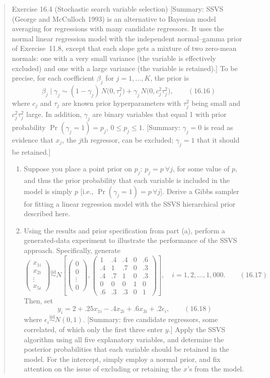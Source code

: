 \documentclass[11pt,a4paper]{article}
\begin{document}
\begin{quote}\small
Exercise 16.4 (Stochastic search variable selection) [Summary: SSVS (George and McCulloch 1993) is an alternative to Bayesian
model averaging for regressions with many candidate regressors. It uses the normal linear regression model with the
independent normal--gamma prior of Exercise~11.8, except that each slope gets a mixture of two zero-mean normals: one with a very
small variance (the variable is effectively excluded) and one with a large variance (the variable is retained).]
To be precise, for each coefficient $\beta_j$ for $j=1,\dots,K$, the prior is
\[
\beta_j\mid\gamma_j\sim(1-\gamma_j)\,N\big(0,\tau_j^2\big)+\gamma_j\,N\big(0,c_j^2\tau_j^2\big),\qquad(16.16)
\]
where $c_j$ and $\tau_j$ are known prior hyperparameters with $\tau_j^2$ being small and $c_j^2\tau_j^2$ large. In addition, $\gamma_j$ are
binary variables that equal 1 with prior probability $\Pr(\gamma_j=1)=p_j$, $0\le p_j\le1$. [Summary: $\gamma_j=0$ is read as evidence
that $x_j$, the $j$th regressor, can be excluded; $\gamma_j=1$ that it should be retained.]
\begin{enumerate}[label=(\alph*),leftmargin=2em]
\item Suppose you place a point prior on $p_j$: $p_j=p\ \forall j$, for some value of $p$, and thus the prior probability that each
variable is included in the model is simply $p$ [i.e., $\Pr(\gamma_j=1)=p\,\forall j$]. Derive a Gibbs sampler for fitting a linear
regression model with the SSVS hierarchical prior described here.
\item Using the results and prior specification from part (a), perform a generated-data experiment to illustrate the
performance of the SSVS approach. Specifically, generate
\[
\begin{pmatrix}x_{1i}\\x_{2i}\\\vdots\\x_{5i}\end{pmatrix}\overset{\text{iid}}{\sim}N\left[\begin{pmatrix}0\\0\\\vdots\\0\end{pmatrix},
\begin{pmatrix}1&.4&.4&0&.6\\.4&1&.7&0&.3\\.4&.7&1&0&.3\\0&0&0&1&0\\.6&.3&.3&0&1\end{pmatrix}\right],\quad i=1,2,\dots,1{,}000.\qquad(16.17)
\]
Then, set
\[
y_i=2+.25x_{1i}-.4x_{2i}+.6x_{3i}+.2\epsilon_i,\qquad(16.18)
\]
where $\epsilon_i\overset{\text{iid}}{\sim}N(0,1)$. [Summary: five candidate regressors, some correlated, of which only the first three
enter $y$.] Apply the SSVS algorithm using all five explanatory variables, and determine the
posterior probabilities that each variable should be retained in the model. For the intercept, simply employ a normal prior,
and fix attention on the issue of excluding or retaining the $x$'s from the model.
\end{enumerate}
\end{quote}
\end{document}
